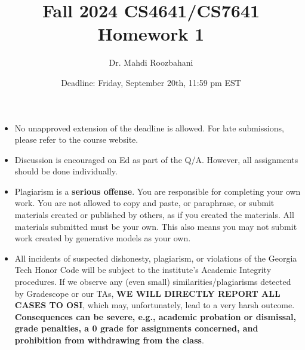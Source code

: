 \documentclass{article}
\title{Fall 2024 CS4641/CS7641 Homework 1}
\author{Dr. Mahdi Roozbahani}
\date{Deadline: Friday, September 20th, 11:59 pm EST}
\begin{document}
\maketitle
\begin{itemize}
    \item No unapproved extension of the deadline is allowed. For late submissions, please refer to the course website.
    \item Discussion is encouraged on Ed as part of the Q/A.      However, all assignments should be done individually.
\item \color{red}Plagiarism is a \textbf{serious offense}. You are responsible for completing your own work. You are not allowed to copy and paste, or paraphrase, or submit materials created or published by others, as if you created the materials. All materials submitted must be your own. This also means you may not submit work created by generative models as your own.\color{black}
    \item \color{red}All incidents of suspected dishonesty, plagiarism, or violations of the Georgia Tech Honor Code will be subject to the institute’s Academic Integrity procedures. If we observe any (even small) similarities/plagiarisms detected by Gradescope or our TAs, \textbf{WE WILL DIRECTLY REPORT ALL CASES TO OSI}, which may, unfortunately, lead to a very harsh outcome. \textbf{Consequences can be severe, e.g., academic probation or dismissal, grade penalties, a 0 grade for assignments concerned, and prohibition from withdrawing from the class}.
\end{itemize}
\end{document}

